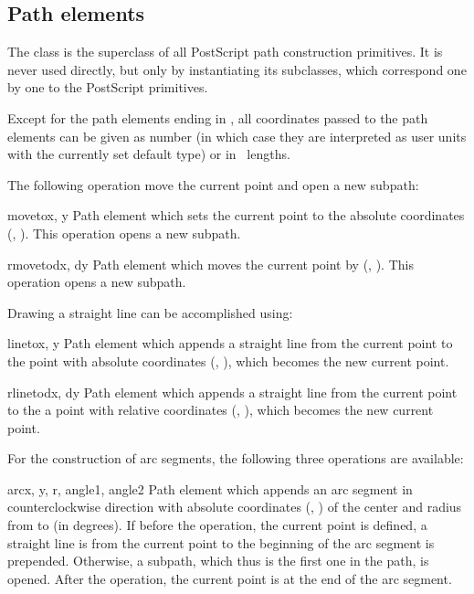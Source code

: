 \subsection{Path elements}

\label{path:pathitem}

The class  is the superclass of all PostScript path
construction primitives. It is never used directly, but only by
instantiating its subclasses, which correspond one by one to the
PostScript primitives.

Except for the path elements ending in , all coordinates
passed to the path elements can be given as number (in which case they
are interpreted as user units with the currently set default type) or in
\PyX\ lengths.

The following operation move the current point and open a new subpath:

\begin{classdesc}{moveto}{x, y}
Path element which sets the current point to the absolute coordinates (,
). This operation opens a new subpath.
\end{classdesc}

\begin{classdesc}{rmoveto}{dx, dy}
Path element which moves the current point by (, ).
This operation opens a new subpath.
\end{classdesc}

Drawing a straight line can be accomplished using:

\begin{classdesc}{lineto}{x, y}
Path element which appends a straight line from the current point to the
point with absolute coordinates (, ), which becomes
the new current point.
\end{classdesc}

\begin{classdesc}{rlineto}{dx, dy}
Path element which appends a straight line from the current point to the
a point with relative coordinates (, ), which becomes
the new current point.
\end{classdesc}

For the construction of arc segments, the following three operations
are available:

\begin{classdesc}{arc}{x, y, r, angle1, angle2}
Path element which appends an arc segment in counterclockwise direction
with absolute coordinates (, ) of the center and 
radius  from  to  (in degrees).
If before the operation, the current point is defined, a straight line
is from the current point to the beginning of the arc segment is
prepended. Otherwise, a subpath, which thus is the first one in the
path, is opened. After the operation, the current point is at the end
of the arc segment.
\end{classdesc}

